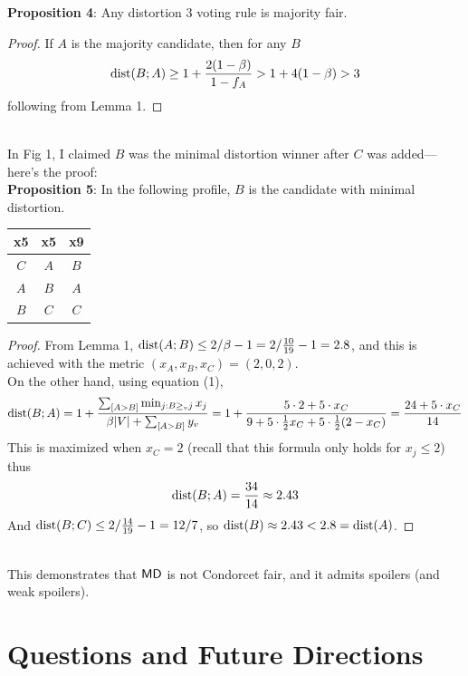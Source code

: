 \documentclass{amsart}
\DeclareMathOperator{\dist}{\rm{dist}}
\DeclareMathOperator{\MD}{\sf{MD}}
\begin{document}
\noindent \textbf{Proposition 4}: Any distortion 3 voting rule is majority fair.
\begin{proof}
	If $A$ is the majority candidate, then for any $B$
	$$
	\dist(B;A) \geq 1 + \frac{2(1-\b)}{1-f_A} > 1 + 4(1-\b) > 3
	$$
	following from Lemma 1.
\end{proof}\\

In Fig 1, I claimed $B$ was the minimal distortion winner after $C$ was added---here's the proof:\\

\noindent \textbf{Proposition 5}: In the following profile, $B$ is the candidate with minimal distortion.

\begin{center}
	\begin{tabular}{|c|c|c|}
	\hline
	x5 & x5 & x9\\
	\hline
	$C$ & $A$ & $B$\\
	\hline
	$A$ & $B$ & $A$\\
	\hline
	$B$ & $C$ & $C$\\
	\hline 
\end{tabular}
\end{center}

\begin{proof}
	From Lemma 1, $\dist(A;B)\leq 2/\b - 1 = 2/\tfrac{10}{19} - 1 = 2.8$, and this is achieved with the metric $(x_A,x_B,x_C)=(2,0,2)$.\\
	
	On the other hand, using equation (1), 
	$$
	\dist(B;A) = 1 + \frac{\sum_{[A>B]} \min_{j:B\geq_v j} x_j}{ \b |V| + \sum_{[A>B]} y_v} = 1+ \frac{5\cdot 2 + 5\cdot x_C}{9 + 5\cdot \tfrac12 x_C + 5\cdot \tfrac12(2-x_C)} = \frac{24+5\cdot x_C}{14}
	$$ 
	This is maximized when $x_C=2$ (recall that this formula only holds for $x_j\leq 2$) thus
	$$
	\dist(B;A) = \frac{34}{14} \approx 2.43
	$$
	And $\dist(B;C) \leq 2/\tfrac{14}{19} - 1 = 12/7$, so $\dist(B)\approx 2.43 < 2.8 = \dist(A)$.
\end{proof}\\

This demonstrates that $\MD$ is not Condorcet fair, and it admits spoilers (and weak spoilers). 


\section{Questions and Future Directions}
\end{document}
